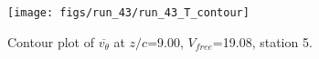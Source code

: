 \begin{figure}[H]
\centering
\texttt{[image: figs/run\_43/run\_43\_T\_contour]}
\caption{Contour plot of $\overline{v_{\theta}}$ at $z/c$=9.00, $V_{free}$=19.08, station 5.}
\label{fig:run_43_T_contour}
\end{figure}


